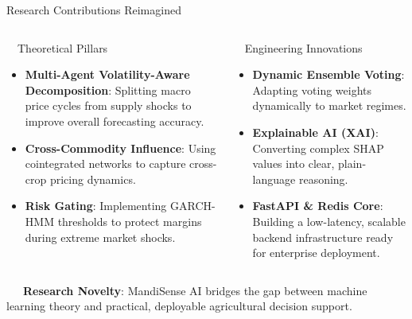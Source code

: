 \documentclass{beamer}
\begin{document}
\begin{frame}{Research Contributions Reimagined}
\vspace{-0.2cm}

\begin{columns}[T]
    \begin{column}{0.48\textwidth}
        \begin{infocard}{~~Theoretical Pillars}
            \fontsize{6.5pt}{8.0pt}\selectfont
            \begin{itemize}\setlength\itemsep{4.5pt}\setlength\parskip{0pt}
                \item \textbf{Multi-Agent Volatility-Aware Decomposition}: Splitting macro price cycles from supply shocks to improve overall forecasting accuracy.
                \item \textbf{Cross-Commodity Influence}: Using cointegrated networks to capture cross-crop pricing dynamics.
                \item \textbf{Risk Gating}: Implementing GARCH-HMM thresholds to protect margins during extreme market shocks.
            \end{itemize}
        \end{infocard}
    \end{column}
    
    \begin{column}{0.48\textwidth}
        \begin{successcard}[height=5.2cm]{~~Engineering Innovations}
            \fontsize{6.5pt}{8.0pt}\selectfont
            \begin{itemize}\setlength\itemsep{4.5pt}\setlength\parskip{0pt}
                \item \textbf{Dynamic Ensemble Voting}: Adapting voting weights dynamically to market regimes.
                \item \textbf{Explainable AI (XAI)}: Converting complex SHAP values into clear, plain-language reasoning.
                \item \textbf{FastAPI \& Redis Core}: Building a low-latency, scalable backend infrastructure ready for enterprise deployment.
            \end{itemize}
        \end{successcard}
    \end{column}
\end{columns}

\vspace{0.15cm}
\begin{tcolorbox}[enhanced, colback=primaryblue!4, colframe=primaryblue!30, boxrule=0.35pt,
  arc=3.5pt, width=0.98\textwidth, left=4pt, right=4pt, top=2.5pt, bottom=2.5pt, boxsep=0pt,
  halign=center, shadow={0.5pt}{-0.5pt}{0pt}{black!8}]
    \fontsize{5.5pt}{6.5pt}\selectfont
    \textcolor{primaryDark}{~~~\textbf{Research Novelty}: MandiSense AI bridges the gap between machine learning theory and practical, deployable agricultural decision support.}
\end{tcolorbox}
\end{frame}
\end{document}
